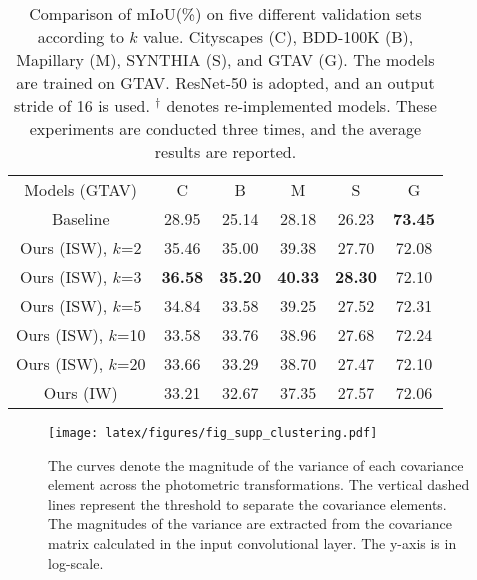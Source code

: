 \documentclass[final]{latex/cvpr}
\newcommand{\drule}{\specialrule{0.2pt}{1pt}{1pt}\specialrule{0.2pt}{0pt}{\belowrulesep}}
\begin{document}
\begin{table}[b!]
\vspace{-0.35cm}
\begin{center}
\footnotesize
\begin{tabular}{c|c|c|c|c||c}
\toprule
Models (GTAV) & C & B & M & S & G\\
\drule
Baseline & 28.95 & 25.14 & 28.18 & 26.23 & \textbf{73.45}  \\ 
\midrule
Ours (ISW), $k$=2 & 35.46 & 35.00 & 39.38 & 27.70 & 72.08 \\ 
\midrule
Ours (ISW), $k$=3 & \textbf{36.58} & \textbf{35.20} & \textbf{40.33} & \textbf{28.30} & 72.10 \\ 
\midrule
Ours (ISW), $k$=5 & 34.84 & 33.58 & 39.25 & 27.52 & 72.31 \\ 
\midrule
Ours (ISW), $k$=10 & 33.58 & 33.76 & 38.96 & 27.68 & 72.24 \\ 
\midrule
Ours (ISW), $k$=20 & 33.66 &  33.29 & 38.70  &  27.47  &  72.10     \\ 
\midrule
Ours (IW) & 33.21 & 32.67 & 37.35 & 27.57 & 72.06 \\ 
\bottomrule
\end{tabular}
\end{center}
\vspace*{-0.0cm}
\caption{Comparison of mIoU(\%) on five different validation sets according to $k$ value. Cityscapes (C), BDD-100K (B), Mapillary (M), SYNTHIA (S), and GTAV (G). The models are trained on GTAV. ResNet-50 is adopted, and an output stride of 16 is used. $^\dagger$ denotes re-implemented models. These experiments are conducted three times, and the average results are reported.}
\label{tab_hyper_parameters1}
\vspace{-0.0cm}
\end{table}


\begin{figure}[t!]
\vspace{-0.1cm}
\centering
  \texttt{[image: latex/figures/fig\_supp\_clustering.pdf]}
  \vspace*{-0.0cm}
  \caption{The curves denote the magnitude of the variance of each covariance element across the photometric transformations. The vertical dashed lines represent the threshold to separate the covariance elements. The magnitudes of the variance are extracted from the covariance matrix calculated in the input convolutional layer. The y-axis is in log-scale.}
\label{fig:supp_cov_clustering}
\vspace*{-0.3cm}
\end{figure}
\end{document}
